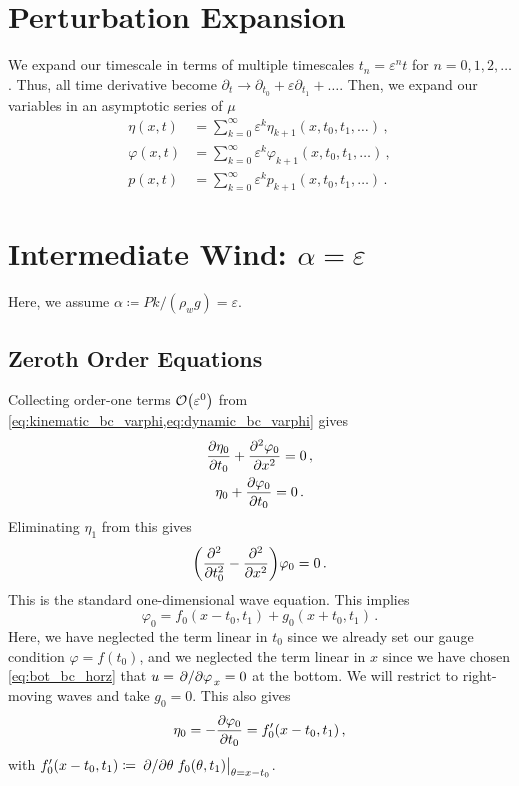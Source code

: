 \documentclass{jfm}
\let\Oldsection\section
\renewcommand{\section}{\FloatBarrier\Oldsection}
\let\Oldsubsection\subsection
\renewcommand{\subsection}{\FloatBarrier\Oldsubsection}
\renewcommand*{\epsilon}{\varepsilon}
\begin{document}
\section{Perturbation Expansion}
\label{sec:shallow_water}
We expand our timescale in terms of multiple timescales $t_n =
\epsilon^n t$ for $n= 0,1,2,\ldots$.
Thus, all time derivative become $\partial_t \to \partial_{t_0} +
\epsilon \partial_{t_1} + \ldots$.
Then, we expand our variables in an asymptotic series of $\mu$
\begin{align}
  \eta(x,t) &= \sum_{k=0}^{\infty} \epsilon^k
    \eta_{k+1}(x,t_0,t_1,\ldots) \,, \\
  \varphi(x,t) &= \sum_{k=0}^{\infty} \epsilon^k
    \varphi_{k+1}(x,t_0,t_1,\ldots) \,, \\
  p(x,t) &= \sum_{k=0}^{\infty} \epsilon^k p_{k+1}(x,t_0,t_1,\ldots)
    \,.
\end{align}

\section{\label{sec:intermediate} \texorpdfstring{Intermediate Wind:
$\alpha = \epsilon$}{Intermediate Wind}}
Here, we assume $\alpha \coloneqq P k/(\rho_w g) = \epsilon$.
\subsection{Zeroth Order Equations}
Collecting order-one terms $\order{\epsilon^0}$ from
\cref{eq:kinematic_bc_varphi,eq:dynamic_bc_varphi} gives
\begin{gather}
  \pdv{\eta_0}{t_0} + \pdv[2]{\varphi_0}{x} = 0 \,, \\
  \eta_0 + \pdv{\varphi_0}{t_0} = 0 \,.
\end{gather}
Eliminating $\eta_1$ from this gives
\begin{equation}
  \pqty{\pdv[2]{t_0} - \pdv[2]{x} } \varphi_0 = 0 \,.
  \label{eq:wave_eq}
\end{equation}
This is the standard one-dimensional wave equation.
This implies
\begin{equation}
  \varphi_0 = f_0(x-t_0,t_1) + g_0(x+t_0,t_1) \,.
  \label{eq:phi0_sol}
\end{equation}
Here, we have neglected the term linear in $t_0$ since we already set
our gauge condition $\varphi = f(t_0)$, and we neglected the term linear
in $x$ since we have chosen \cref{eq:bot_bc_horz} that $u =
\pdv*{\varphi}_x = 0$ at the bottom.
We will restrict to right-moving waves and take $g_0 = 0$.
This also gives
\begin{equation}
  \eta_0 = - \pdv{\varphi_0}{t_0} = f_0'(x-t_0,t_1) \,,
  \label{eq:eta0_sol}
\end{equation}
with $f_0'(x-t_0,t_1) \coloneqq \eval{\pdv*{\theta}
f_0(\theta,t_1)}_{\theta = x-t_0}$.
\end{document}
